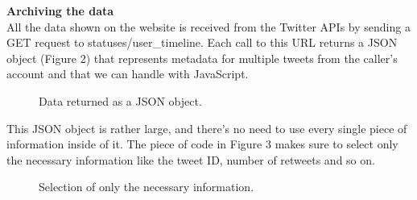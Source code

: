 \documentclass[12pt]{article} %
\begin{document}
\noindent\textbf{Archiving the data}
\\[0.3cm]
All the data shown on the website is received from the Twitter APIs by sending a GET request to statuses/user\_timeline.
Each call to this URL returns a JSON object (Figure 2) that represents metadata for multiple tweets from the caller's account and that we can handle with JavaScript.

\begin{figure}[H] %
\caption{Data returned as a JSON object.}
\label{getStatusesTimeline}
\end{figure}

\noindent This JSON object is rather large, and there's no need to use every single piece of information inside of it.
The piece of code in Figure 3 makes sure to select only the necessary information like the tweet ID, number of retweets and so on.

\begin{figure}[H] %
\caption{Selection of only the necessary information.}
\label{informationSelection}
\end{figure}
\end{document}
